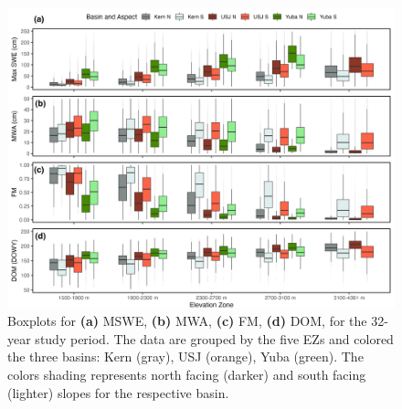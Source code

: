 \begin{figure}[t]
\centering
\includegraphics[width=14cm]{figures/ch2_figs/snow4_boxplot_v5.png}
\caption{Boxplots for \textbf{(a)} MSWE, \textbf{(b)} MWA, \textbf{(c)} FM, \textbf{(d)} DOM, for the 32-year study period. The data are grouped by the five EZs and colored the three basins: Kern (gray), USJ (orange), Yuba (green). The colors shading represents north facing (darker) and south facing (lighter) slopes for the respective basin.}
\label{snow_boxplots}
\end{figure}

